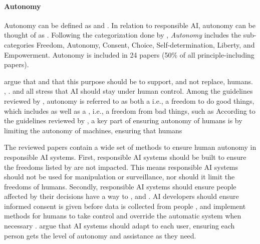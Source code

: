 \paragraph{Autonomy}
Autonomy can be defined as  and  \parencite{dictionary_autonomy}. In relation to responsible AI, autonomy can be thought of as  \parencite[p. 697-698]{Floridi_2018}. Following the categorization done by \textcite[Table 1]{Ryan_2021}, \textit{Autonomy} includes the sub-categories Freedom, Autonomy, Consent, Choice, Self-determination, Liberty, and Empowerment. Autonomy is included in 24 papers (50\% of all principle-including papers).

\textcite[p. 5]{Rothenberger_2019} argue that  and that this purpose should be to support, and not replace, humans. \textcite[p. 387]{Thelisson_2018}, \textcite[p. 102]{Lu_2022}. \textcite[p. 53]{Fjeld_2020} and \textcite[p. 416]{Clarke_2019} all stress that AI should stay under human control. Among the guidelines reviewed by \textcite[p. 11]{Jobin_2019}, autonomy is referred to as both a  i.e., a freedom to do good things, which includes  as well as a , i.e., a freedom from bad things, such as  According to the guidelines reviewed by \textcite[p. 698]{Floridi_2018}, a key part of ensuring autonomy of humans is by limiting the autonomy of machines, ensuring that humans  

The reviewed papers
contain a wide set of methods to ensure human autonomy in responsible AI systems. First, responsible AI systems should be built to ensure the freedoms listed by \textcite{Jobin_2019} are not impacted. This means responsible AI systems should not be used for manipulation or surveillance, nor should it limit the freedoms of humans. Secondly, responsible AI systems should ensure people affected by their decisions have a way to  \parencite[p. 102]{Lu_2022},  \parencite[p. 53]{Fjeld_2020} and  \parencite[p. 54]{Fjeld_2020}. AI developers should ensure informed consent is given before data is collected from people \parencite{Lukkien_2021,Jobin_2019}, and implement methods for humans to take control and override the automatic system when necessary \parencite{Floridi_2018,Rakova_2021}. \textcite{Liu_2021} argue that AI systems should adapt to each user, ensuring each person gets the level of autonomy and assistance as they need. 

